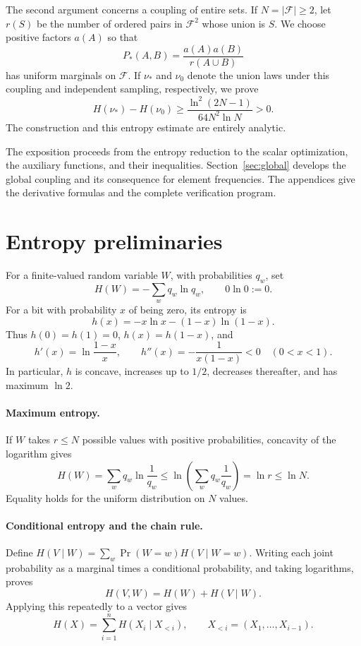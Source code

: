 \documentclass[11pt]{article}
\theoremstyle{remark}
\newcommand{\F}{\mathcal F}
\begin{document}
The second argument concerns a coupling of entire sets. If \(N=|\F|\ge2\),
let \(r(S)\) be the number of ordered pairs in \(\F^2\) whose union is \(S\).
We choose positive factors \(a(A)\) so that
\[
P_*(A,B)=\frac{a(A)a(B)}{r(A\cup B)}
\]
has uniform marginals on \(\F\). If \(\nu_*\) and \(\nu_0\) denote the
union laws under this coupling and independent sampling, respectively,
we prove
\[
H(\nu_*)-H(\nu_0)\ge
\frac{\ln^2(2N-1)}{64N^2\ln N}>0.
\]
The construction and this entropy estimate are entirely analytic.

The exposition proceeds from the entropy reduction to the scalar
optimization, the auxiliary functions, and their inequalities.
Section~\ref{sec:global} develops the global coupling and its consequence
for element frequencies. The appendices give the derivative formulas
and the complete verification program.

\section{Entropy preliminaries}\label{sec:entropy}

For a finite-valued random variable \(W\), with probabilities \(q_w\), set
\[
H(W)=-\sum_w q_w\ln q_w,\qquad 0\ln0:=0.
\]
For a bit with probability \(x\) of being zero, its entropy is
\[
h(x)=-x\ln x-(1-x)\ln(1-x).
\]
Thus \(h(0)=h(1)=0\), \(h(x)=h(1-x)\), and
\begin{equation}\label{eq:hderivatives}
h'(x)=\ln\frac{1-x}{x},\qquad
h''(x)=-\frac{1}{x(1-x)}<0\quad(0<x<1).
\end{equation}
In particular, \(h\) is concave, increases up to \(1/2\), decreases
thereafter, and has maximum \(\ln2\).

\paragraph{Maximum entropy.}
If \(W\) takes \(r\le N\) possible values with positive probabilities,
concavity of the logarithm gives
\[
H(W)=\sum_w q_w\ln\frac1{q_w}
\le\ln\left(\sum_wq_w\frac1{q_w}\right)=\ln r\le\ln N.
\]
Equality holds for the uniform distribution on \(N\) values.

\paragraph{Conditional entropy and the chain rule.}
Define \(H(V\mid W)=\sum_w\Pr(W=w)H(V\mid W=w)\).
Writing each joint probability as a marginal times a conditional
probability, and taking logarithms, proves
\[
H(V,W)=H(W)+H(V\mid W).
\]
Applying this repeatedly to a vector gives
\begin{equation}\label{eq:chain}
H(X)=\sum_{i=1}^n H(X_i\mid X_{<i}),\qquad
X_{<i}=(X_1,\ldots,X_{i-1}).
\end{equation}
\end{document}
